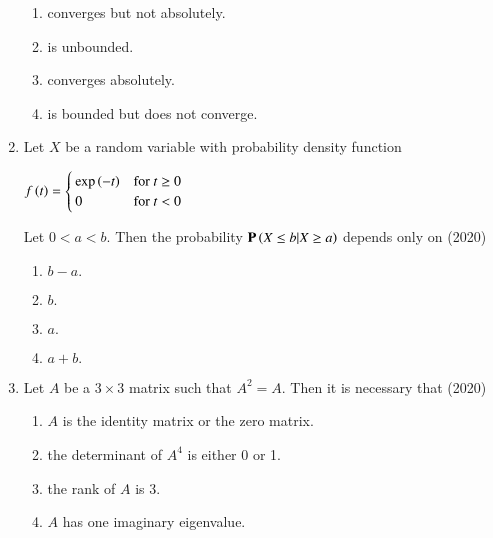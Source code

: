 \documentclass[journal]{IEEEtran}
\begin{document}
\begin{enumerate}
        \begin{enumerate}
            \item converges but not absolutely.
            \item is unbounded.
            \item converges absolutely.
            \item is bounded but does not converge.
        \end{enumerate}


    \item Let $X$ be a random variable with probability density function
    
    \begin{center}
    $f\left(t\right)=
    \begin{cases}
        \exp\left(-t\right) & \text{for } t\geq0\\
        0 & \text{for } t<0
    \end{cases}$
    \end{center}
    
    Let $0<a<b$. Then the probability $\mathbf{P}\left(X\leq b|X\geq a\right)$ depends only on
    \hfill{(2020)}

    \begin{multicols}{4}
        \begin{enumerate}
            \item $b-a.$
            \item $b.$
            \item $a.$
            \item $a+b.$
        \end{enumerate}
    \end{multicols}


    \item Let $A$ be a $3\times3$ matrix such that $A^2=A$. Then it is necessary that 
    \hfill{(2020)}


        \begin{enumerate}
            \item $A$ is the identity matrix or the zero matrix.
            \item the determinant of $A^4$ is either 0 or 1.
            \item the rank of $A$ is 3.
            \item $A$ has one imaginary eigenvalue.
        \end{enumerate}


    

\end{enumerate}
\end{document}
